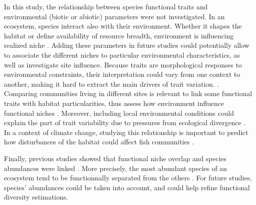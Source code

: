 In this study, the relationship between species functional traits and environmental (biotic or abiotic) parameters were not investigated. In an ecosystem, species interact also with their environment. Whether it shapes the habitat or define availability of resource breadth, environment is influencing realized niche \citep{costa-pereira2019,ibanez2007,kremer2017}. Adding these parameters in future studies could potentially allow to associate the different niches to particular environmental characteristics, as well as investigate site influence. Because traits are morphological responses to environmental constraints, their interpretation could vary from one context to another, making it hard to extract the main drivers of trait variation. \citep{kremer2017}. Comparing communities living in different sites is relevant to link some functional traits with habitat particularities, thus assess how environment influence functional niches \citep{mejri2009}. Moreover, including local environmental conditions could explain the part of trait variability due to pressures from ecological divergence \citep{dasilva2019}. In a context of climate change, studying this relationship is important to predict how disturbances of the habitat could affect fish communities \citep{brindamour2011}. 

Finally, previous studies showed that functional niche overlap and species abundances were linked \citep{aneeshkumar2017,mason2008}. More precisely, the most abundant species of an ecosystem tend to be functionnally separated from the others \citep{farre2016}. For future studies, species' abundances could be taken into account, and could help refine functional diversity estimations. \\




